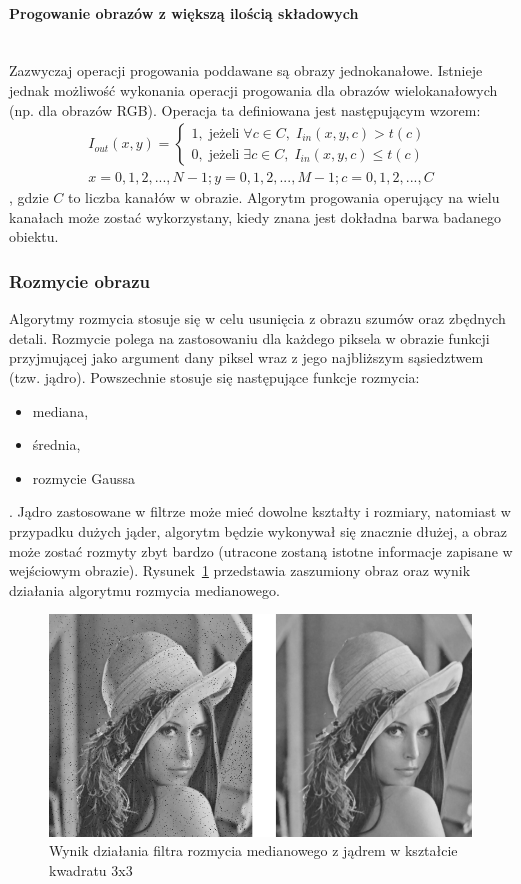 \paragraph{Progowanie obrazów z większą ilością składowych}\mbox{}\\
Zazwyczaj operacji progowania poddawane są obrazy jednokanałowe. Istnieje jednak możliwość wykonania operacji progowania dla obrazów wielokanałowych (np. dla obrazów RGB). Operacja ta definiowana jest następującym wzorem:
\begin{gather*}
  I_{out}(x, y) = \left\{\begin{matrix}
  1, \; \text{jeżeli} \; \forall c \in C, \; I_{in}(x, y, c) > t(c)\\
  0, \; \text{jeżeli} \; \exists c \in C, \; I_{in}(x, y, c) \leq t(c)
  \end{matrix}\right.\\ x=0,1,2,...,N-1; y=0,1,2,...,M-1; c=0,1,2,...,C
\end{gather*},
gdzie $C$ to liczba kanałów w obrazie.
Algorytm progowania operujący na wielu kanałach może zostać wykorzystany, kiedy znana jest dokładna barwa badanego obiektu.

\subsubsection{Rozmycie obrazu}
Algorytmy rozmycia stosuje się w celu usunięcia z obrazu szumów oraz zbędnych detali. Rozmycie polega na zastosowaniu dla każdego piksela w obrazie funkcji przyjmującej jako argument dany piksel wraz z jego najbliższym sąsiedztwem (tzw. jądro). Powszechnie stosuje się następujące funkcje rozmycia:
\begin{itemize}
\item mediana,
\item średnia,
\item rozmycie Gaussa
\end{itemize}
. Jądro zastosowane w filtrze może mieć dowolne kształty i rozmiary, natomiast w przypadku dużych jąder, algorytm będzie wykonywał się znacznie dłużej, a obraz może zostać rozmyty zbyt bardzo (utracone zostaną istotne informacje zapisane w wejściowym obrazie).
Rysunek~\ref{fig:lena_smooth} przedstawia zaszumiony obraz oraz wynik działania algorytmu rozmycia medianowego.
\begin{figure}
  \centering
  \includegraphics[width=15cm]{img/lena-smooth}
  \caption{Wynik działania filtra rozmycia medianowego z jądrem w kształcie kwadratu 3x3}
  \label{fig:lena_smooth}
\end{figure}


